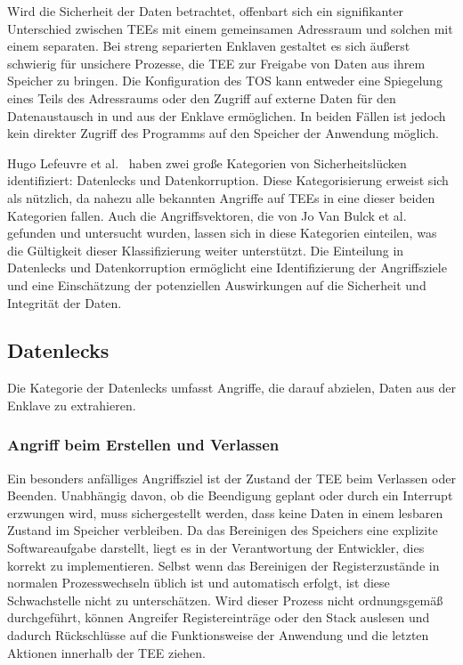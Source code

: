 Wird die Sicherheit der Daten betrachtet, offenbart sich ein signifikanter Unterschied zwischen TEEs mit einem gemeinsamen Adressraum und solchen mit einem separaten. 
Bei streng separierten Enklaven gestaltet es sich äußerst schwierig für unsichere Prozesse, die TEE zur Freigabe von Daten aus ihrem Speicher zu bringen.
Die Konfiguration des TOS kann entweder eine Spiegelung eines Teils des Adressraums oder den Zugriff auf externe Daten für den Datenaustausch in und aus der Enklave ermöglichen. 
In beiden Fällen ist jedoch kein direkter Zugriff des Programms auf den Speicher der Anwendung möglich.

Hugo Lefeuvre et al.~\cite{CIVPaper} haben zwei große Kategorien von Sicherheitslücken identifiziert: Datenlecks und Datenkorruption. Diese Kategorisierung erweist sich als nützlich, da nahezu alle bekannten Angriffe auf TEEs in eine dieser beiden Kategorien fallen. Auch die Angriffsvektoren, die von Jo Van Bulck et al.\cite{TEEPaper} gefunden und untersucht wurden, lassen sich in diese Kategorien einteilen, was die Gültigkeit dieser Klassifizierung weiter unterstützt. Die Einteilung in Datenlecks und Datenkorruption ermöglicht eine Identifizierung der Angriffsziele und eine Einschätzung der potenziellen Auswirkungen auf die Sicherheit und Integrität der Daten.

\subsection{Datenlecks}
Die Kategorie der Datenlecks umfasst Angriffe, die darauf abzielen, Daten aus der Enklave zu extrahieren. 

\subsubsection{Angriff beim Erstellen und Verlassen}
Ein besonders anfälliges Angriffsziel ist der Zustand der TEE beim Verlassen oder Beenden. Unabhängig davon, ob die Beendigung geplant oder durch ein Interrupt erzwungen wird, muss sichergestellt werden, dass keine Daten in einem lesbaren Zustand im Speicher verbleiben. Da das Bereinigen des Speichers eine explizite Softwareaufgabe darstellt, liegt es in der Verantwortung der Entwickler, dies korrekt zu implementieren. Selbst wenn das Bereinigen der Registerzustände in normalen Prozesswechseln üblich ist und automatisch erfolgt, ist diese Schwachstelle nicht zu unterschätzen. Wird dieser Prozess nicht ordnungsgemäß durchgeführt, können Angreifer Registereinträge oder den Stack auslesen und dadurch Rückschlüsse auf die Funktionsweise der Anwendung und die letzten Aktionen innerhalb der TEE ziehen.

